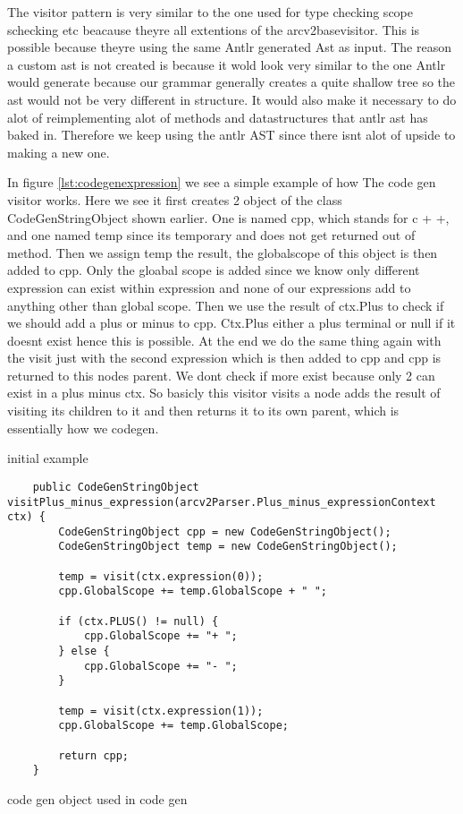 The visitor pattern is very similar to the one used for type checking scope schecking etc beacause theyre all extentions of the arcv2basevisitor. This is possible because theyre using the same Antlr generated Ast as input. The reason a custom ast is not created is because it wold look very similar to the one Antlr would generate because our grammar generally creates a quite shallow tree so the ast would not be very different in structure. It would also make it necessary to do alot of reimplementing alot of methods and datastructures that antlr ast has baked in. Therefore we keep using the antlr AST since there isnt alot of upside to making a new one.  


In figure \ref{lst:codegenexpression} we see a simple example of how The code gen visitor works. Here we see it first creates 2 object of the class CodeGenStringObject shown earlier. One is named cpp, which stands for c + +, and one named temp since its temporary and does not get returned out of method. Then we assign temp the result, the globalscope of this object is then added to cpp. Only the gloabal scope is added since we know only different expression can exist within expression and none of our expressions add to anything other than global scope. Then we use the result of ctx.Plus to check if we should add a plus or minus to cpp. Ctx.Plus either a plus terminal or null if it doesnt exist hence this is possible. At the end we do the same thing again with the visit just with the second expression which is then added to cpp and cpp is returned to this nodes parent. We dont check if more exist because only 2 can exist in a plus minus ctx. So basicly this visitor visits a node adds the result of visiting its children to it and then returns it to its own parent, which is essentially how we codegen.




initial example 
\begin{listing}[htb!]
    \begin{verbatim}
    public CodeGenStringObject visitPlus_minus_expression(arcv2Parser.Plus_minus_expressionContext ctx) {
        CodeGenStringObject cpp = new CodeGenStringObject();
        CodeGenStringObject temp = new CodeGenStringObject();

        temp = visit(ctx.expression(0));
        cpp.GlobalScope += temp.GlobalScope + " ";

        if (ctx.PLUS() != null) {
            cpp.GlobalScope += "+ ";
        } else {
            cpp.GlobalScope += "- ";
        }

        temp = visit(ctx.expression(1));
        cpp.GlobalScope += temp.GlobalScope;

        return cpp;
    }
\end{verbatim}
\caption{code gen object used in code gen}
\label{lst:codegenexpression}
\end{listing}


